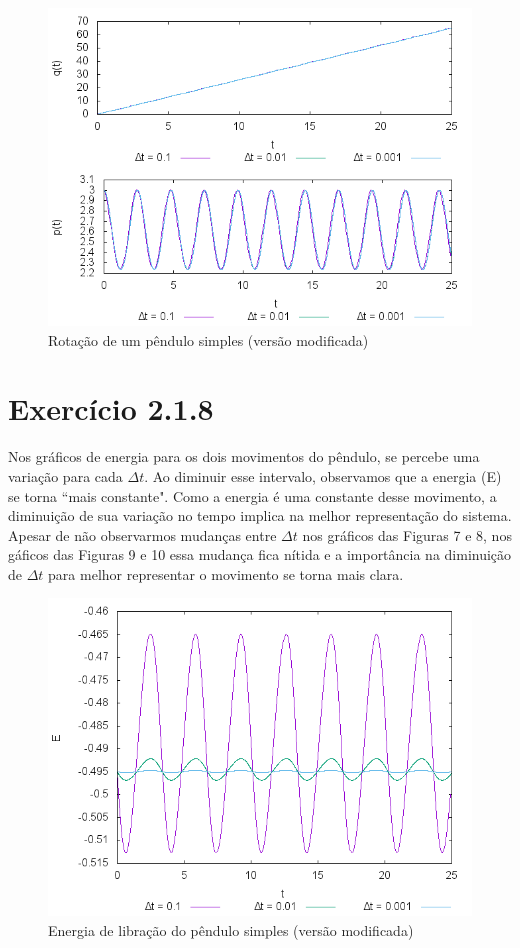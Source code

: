 \documentclass[a4paper,10pt]{article}
\begin{document}
  \begin{figure}[H]
    \centering
    \includegraphics[scale=0.6]{../Programa2/Figura8.png}
    \caption{Rotação de um pêndulo simples (versão modificada)}
  \end{figure}

\section*{Exercício 2.1.8}

  Nos gráficos de energia para os dois movimentos do pêndulo, se percebe uma variação para cada $\Delta t$. Ao diminuir esse
  intervalo, observamos que a energia (E) se torna ``mais constante". Como a energia é uma constante desse movimento, a diminuição de sua
  variação no tempo implica na melhor representação do sistema. Apesar de não observarmos mudanças entre $\Delta t$ nos gráficos das Figuras
  7 e 8, nos gáficos das Figuras 9 e 10 essa mudança fica nítida e a importância na diminuição de $\Delta t$ para melhor representar o movimento
  se torna mais clara.

  \begin{figure}[H]
    \centering
    \includegraphics[scale=0.6]{../Programa2/Figura9.png}
    \caption{Energia de libração do pêndulo simples (versão modificada)}
  \end{figure}
\end{document}
